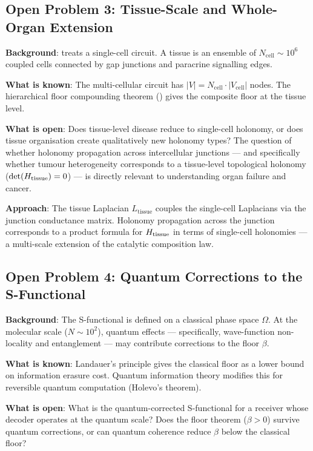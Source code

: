 \subsection{Open Problem 3: Tissue-Scale and Whole-Organ Extension}

\textbf{Background}:  treats a single-cell circuit.
A tissue is an ensemble of $N_{\mathrm{cell}} \sim 10^6$ coupled cells
connected by gap junctions and paracrine signalling edges.

\textbf{What is known}: The multi-cellular circuit has $|V| = N_{\mathrm{cell}}
\cdot |V_{\mathrm{cell}}|$ nodes.  The hierarchical floor compounding theorem
() gives the composite floor at the tissue level.

\textbf{What is open}: Does tissue-level disease reduce to single-cell holonomy,
or does tissue organisation create qualitatively new holonomy types?  The
question of whether holonomy propagation across intercellular junctions —
and specifically whether tumour heterogeneity corresponds to a tissue-level
topological holonomy ($\det(H_{\mathrm{tissue}}) = 0$) — is directly
relevant to understanding organ failure and cancer.

\textbf{Approach}: The tissue Laplacian $L_{\mathrm{tissue}}$ couples the
single-cell Laplacians via the junction conductance matrix.  Holonomy
propagation across the junction corresponds to a product formula for
$H_{\mathrm{tissue}}$ in terms of single-cell holonomies — a multi-scale
extension of the catalytic composition law.

\subsection{Open Problem 4: Quantum Corrections to the S-Functional}

\textbf{Background}: The S-functional is defined on a classical phase space
$\Omega$.  At the molecular scale ($N \sim 10^2$), quantum effects —
specifically, wave-function non-locality and entanglement — may contribute
corrections to the floor $\beta$.

\textbf{What is known}: Landauer's principle gives the classical floor as a
lower bound on information erasure cost.  Quantum information theory modifies
this for reversible quantum computation (Holevo's theorem).

\textbf{What is open}: What is the quantum-corrected S-functional for a
receiver whose decoder operates at the quantum scale?  Does the floor theorem
($\beta > 0$) survive quantum corrections, or can quantum coherence reduce
$\beta$ below the classical floor?

